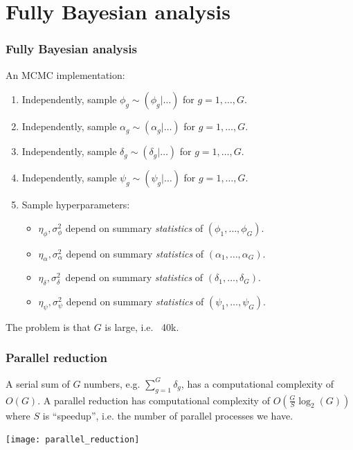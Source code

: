 \documentclass[handout]{beamer}\usepackage[]{graphicx}\usepackage[]{color}
\begin{document}
\section{Fully Bayesian analysis}
\begin{frame}
\frametitle{Fully Bayesian analysis}

An MCMC implementation:
\begin{enumerate}
\item Independently, sample $\phi_g \sim (\phi_g|\ldots)$ for $g=1,\ldots,G$.
\item Independently, sample $\alpha_g \sim (\alpha_g|\ldots)$ for $g=1,\ldots,G$.
\item Independently, sample $\delta_g \sim (\delta_g|\ldots)$ for $g=1,\ldots,G$.
\item Independently, sample $\psi_g \sim (\psi_g|\ldots)$ for $g=1,\ldots,G$.

\vspace{0.1in} \pause

\item Sample hyperparameters:
\begin{itemize}
\item $\eta_\phi,\sigma_\phi^2$ depend on summary \emph{statistics} of $(\phi_1,\ldots,\phi_G)$.
\item $\eta_\alpha,\sigma_\alpha^2$ depend on summary \emph{statistics} of $(\alpha_1,\ldots,\alpha_G)$.
\item $\eta_\delta,\sigma_\delta^2\,$ depend on summary \emph{statistics} of $(\delta_1,\ldots,\delta_G)$.
\item $\eta_\psi,\sigma_\psi^2$ depend on summary \emph{statistics} of $(\psi_1,\ldots,\psi_G)$.
\end{itemize}
\end{enumerate}

\vspace{0.1in} \pause

The problem is that $G$ is large, i.e. ~40k.

\end{frame}


\begin{frame}
\frametitle{Parallel reduction}

A serial sum of $G$ numbers, e.g. $\sum_{g=1}^G \delta_g$, has a computational complexity of $O(G)$. \pause
A parallel reduction has computational complexity of $O\left(\frac{G}{S} \log_2(G) \right)$ where $S$ is ``speedup'', i.e. the number of parallel processes we have. 

\vspace{0.2in} \pause

\begin{center}
\texttt{[image: parallel\_reduction]}
\end{center}

\end{frame}
\end{document}
